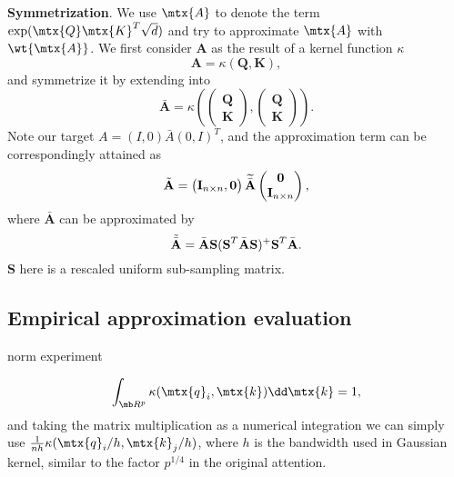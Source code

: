 \textbf{Symmetrization}. We use $\mtx{A}$ to denote the term $\exp(\mtx{Q} \mtx{K}^{T} \sqrt{d})$ and try to approximate $\mtx{A}$ with $\wt{\mtx{A}}$.
We first consider $\textbf{A}$ as the result of a kernel function $\kappa$
\begin{equation}
    \nonumber
    \textbf{A} = \kappa (\textbf{Q},\textbf{K}),
\end{equation}
and symmetrize it by extending into
\begin{equation}
    \nonumber
    \bar{\textbf{A}} = \kappa (
        \begin{pmatrix}
        \textbf{Q}  \\
        \textbf{K} 
        \end{pmatrix},
        \begin{pmatrix}
        \textbf{Q}  \\
        \textbf{K} 
        \end{pmatrix}).
\end{equation} 
Note our target $A = (I, 0) \bar A (0, I)^T$, and the approximation term can be correspondingly attained as
\begin{equation}
    \nonumber
    \Tilde{\textbf{A}} = 
        \begin{pmatrix}
            \textbf{I}_{n \times n},
            \textbf{0}
        \end{pmatrix}
        \widetilde{\bar{\textbf{A}}}
        \begin{pmatrix}
            \textbf{0} \\
            \textbf{I}_{n \times n}  
        \end{pmatrix},
\end{equation}
where $\bar{\textbf{A}}$ can be approximated by
\begin{equation}
    \nonumber
    \Tilde{\bar{\textbf{A}}} = \bar{\textbf{A}} \textbf{S} (\textbf{S}^{T}\bar{\textbf{A}}\textbf{S})^{+}\textbf{S}^{T}\bar{\textbf{A}}.
\end{equation}
$\textbf{S}$ here is a rescaled uniform sub-sampling matrix.
\subsection{Empirical approximation evaluation}

norm experiment
\fi

\iffalse

\begin{align*}
\int_{\mb R^p} \kappa(\mtx{q}_i,  \mtx{k}) \dd \mtx{k} = 1,
\end{align*}
and taking the matrix multiplication as a numerical integration we can simply use $\frac{1}{nh} \kappa(\mtx{q}_i/h,  \mtx{k}_j/h)$, where $h$ is the bandwidth used in Gaussian kernel, similar to the factor $p^{1/4}$ in the original attention.


